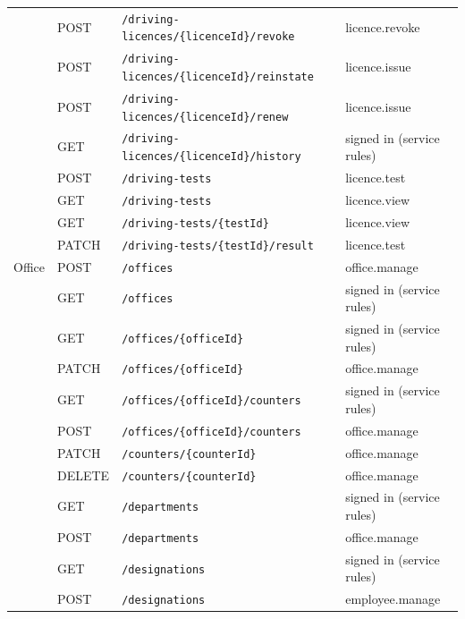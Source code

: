 \begin{longtable}{@{}p{2.1cm}l p{6.6cm} p{3.2cm}@{}}
 & POST & \texttt{/\allowbreak{}driving-licences/\allowbreak{}\{licenceId\}/\allowbreak{}revoke} & licence.revoke \\
 & POST & \texttt{/\allowbreak{}driving-licences/\allowbreak{}\{licenceId\}/\allowbreak{}reinstate} & licence.issue \\
 & POST & \texttt{/\allowbreak{}driving-licences/\allowbreak{}\{licenceId\}/\allowbreak{}renew} & licence.issue \\
 & GET & \texttt{/\allowbreak{}driving-licences/\allowbreak{}\{licenceId\}/\allowbreak{}history} & signed in (service rules) \\
 & POST & \texttt{/\allowbreak{}driving-tests} & licence.test \\
 & GET & \texttt{/\allowbreak{}driving-tests} & licence.view \\
 & GET & \texttt{/\allowbreak{}driving-tests/\allowbreak{}\{testId\}} & licence.view \\
 & PATCH & \texttt{/\allowbreak{}driving-tests/\allowbreak{}\{testId\}/\allowbreak{}result} & licence.test \\
Office & POST & \texttt{/\allowbreak{}offices} & office.manage \\
 & GET & \texttt{/\allowbreak{}offices} & signed in (service rules) \\
 & GET & \texttt{/\allowbreak{}offices/\allowbreak{}\{officeId\}} & signed in (service rules) \\
 & PATCH & \texttt{/\allowbreak{}offices/\allowbreak{}\{officeId\}} & office.manage \\
 & GET & \texttt{/\allowbreak{}offices/\allowbreak{}\{officeId\}/\allowbreak{}counters} & signed in (service rules) \\
 & POST & \texttt{/\allowbreak{}offices/\allowbreak{}\{officeId\}/\allowbreak{}counters} & office.manage \\
 & PATCH & \texttt{/\allowbreak{}counters/\allowbreak{}\{counterId\}} & office.manage \\
 & DELETE & \texttt{/\allowbreak{}counters/\allowbreak{}\{counterId\}} & office.manage \\
 & GET & \texttt{/\allowbreak{}departments} & signed in (service rules) \\
 & POST & \texttt{/\allowbreak{}departments} & office.manage \\
 & GET & \texttt{/\allowbreak{}designations} & signed in (service rules) \\
 & POST & \texttt{/\allowbreak{}designations} & employee.manage \\

\end{longtable}
